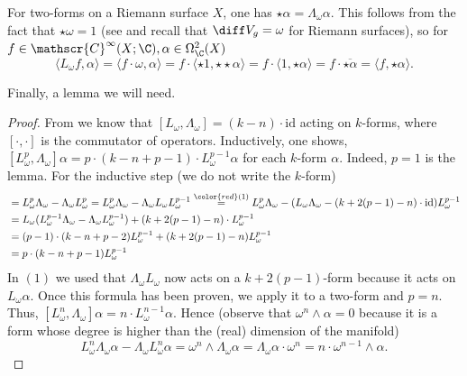 {\begin{obs} \label{obs_hodgestar_equal_lambda}
    For two-forms on a Riemann surface \(X\), one has \(\star \alpha = \Lambda_\omega \alpha\). This follows from the fact that \(\star \omega=1\) (see \parencite[6.2.1]{munoz2020geometry} and recall that \(\diff V_g=\omega\) for Riemann surfaces), so for \(f \in \mathscr{C}^\infty(X;\C), \alpha \in \Omega^2_\C(X)\)
    \[
    \langle L_\omega f, \alpha\rangle = \langle f \cdot \omega, \alpha\rangle = f\cdot \langle \star 1, \star \star \alpha \rangle = f\cdot \langle 1, \star\alpha \rangle  =  f\cdot \overline{\star \alpha}=\langle f, \star \alpha \rangle.
    \]
\end{obs}

Finally, a lemma we will need.

\begin{proof}
    From \parencite[Lemma 9.39]{lee_introCM} we know that \([L_\omega, \Lambda_\omega]=(k-n)\cdot \mathrm{id}\) acting on \(k\)-forms, where \([\cdot, \cdot]\) is the commutator of operators. Inductively, one shows, \([L_\omega^p, \Lambda_\omega]\alpha=p\cdot(k-n+p-1) \cdot L_\omega ^{p-1}\alpha\) for each \(k\)-form \(\alpha\). Indeed, \(p=1\) is the lemma. For the inductive step (we do not write the \(k\)-form)
    \begin{align*}
        [L_\omega^p, \Lambda_\omega] & = L_\omega^p\Lambda_\omega-\Lambda_\omega L_\omega^p =  L_\omega^p \Lambda_\omega-\Lambda_\omega L_\omega L_\omega^{p-1} \overset{{\color{red}(1)}}{=} L_\omega^p \Lambda_\omega-(L_\omega \Lambda_\omega-(k+2(p-1)-n)\cdot \mathrm{id})L_\omega^{p-1} \\
        & = L_\omega (L_\omega^{p-1}\Lambda_\omega-\Lambda_\omega L_\omega^{p-1})+(k+2(p-1)-n) \cdot L_\omega^{p-1} \\
        & = (p-1)\cdot (k-n+p-2) L_\omega^{p-1} + (k+2(p-1)-n) L_\omega^{p-1} \\
        & = p\cdot (k-n+p-1) L_\omega^{p-1}
    \end{align*}
    In {\color{red}\((1)\)} we used that \(\Lambda_\omega L_\omega\) now acts on a \(k+2(p-1)\)-form because it acts on \(L_\omega \alpha\). Once this formula has been proven, we apply it to a two-form and \(p=n\). Thus, \([L_\omega^n, \Lambda_\omega]\alpha=n\cdot L_\omega^{n-1}\alpha\). Hence (observe that \(\omega^n\wedge \alpha=0\) because it is a form whose degree is higher than the (real) dimension of the manifold)
    \[
    L_\omega^n \Lambda_\omega\alpha -\Lambda_\omega L_\omega^n \alpha= \omega^n \wedge \Lambda_\omega \alpha = \Lambda_\omega \alpha \cdot \omega^n = n \cdot \omega^{n-1} \wedge  \alpha.
    \]
\end{proof}
}